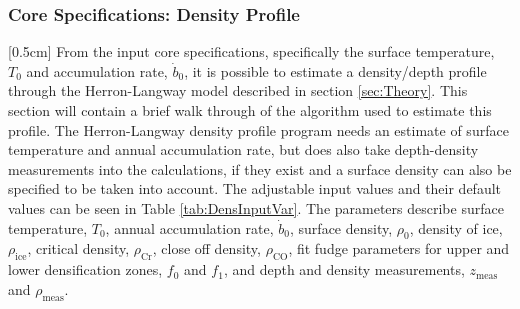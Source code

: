 \documentclass[../../CompleteThesis/Complete_1stDraft.tex]{subfiles}
\begin{document}
\subsubsection[Density Profile]{Core Specifications: Density Profile}
\label{Subsubsec:Method_FirstSigmaEstimate_PrelimComputations_DensProfile}
[0.5cm]%
From the input core specifications, specifically the surface temperature, $T_0$ and accumulation rate, $\dot{b}_0$, it is possible to estimate a density/depth profile through the Herron-Langway model described in section \ref{sec:Theory}. This section will contain a brief walk through of the algorithm used to estimate this profile.
The Herron-Langway density profile program needs an estimate of surface temperature and annual accumulation rate, but does also take depth-density measurements into the calculations, if they exist and a surface density can also be specified to be taken into account. The adjustable input values and their default values can be seen in Table \ref{tab:DensInputVar}. The parameters describe surface temperature, $T_0$, annual accumulation rate, $\dot{b}_0$, surface density, $\rho_0$, density of ice, $\rho_{\text{ice}}$, critical density, $\rho_{\text{Cr}}$, close off density, $\rho_{\text{CO}}$, fit fudge parameters for upper and lower densification zones, $f_0$ and $f_1$, and depth and density measurements, $z_{\text{meas}}$ and $\rho_{\text{meas}}$. 
\end{document}

